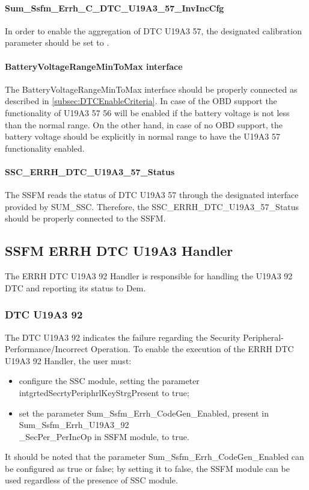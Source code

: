 \paragraph{Sum\_Ssfm\_Errh\_C\_DTC\_U19A3\_57\_InvIncCfg}
In order to enable the aggregation of DTC U19A3 57, the designated calibration parameter should be set to .

\paragraph{BatteryVoltageRangeMinToMax interface}
The BatteryVoltageRangeMinToMax interface should be properly connected as described in \ref{subsec:DTCEnableCriteria}. In case of the OBD support the
functionality of U19A3 57 56 will be enabled if the battery voltage is not less than the normal range. On the other hand, in case of no OBD support, the
battery voltage should be explicitly in normal range to have the U19A3 57 functionality enabled.

\paragraph{SSC\_ERRH\_DTC\_U19A3\_57\_Status}
The SSFM reads the status of DTC U19A3 57 through the designated interface provided by SUM\_SSC. Therefore, the SSC\_ERRH\_DTC\_U19A3\_57\_Status should 
be properly connected to the SSFM.


\subsection{SSFM ERRH DTC U19A3 Handler}
\label{subsec:SSFMERRHDTCU19A3Handler}
The ERRH DTC U19A3 92 Handler is responsible for handling the U19A3 92 DTC and reporting its status to Dem.

\subsubsection{DTC U19A3 92}

The DTC U19A3 92 indicates the failure regarding the Security Peripheral-Performance/Incorrect Operation.
To enable the execution of the ERRH DTC U19A3 92 Handler, the user must:
\begin{itemize} 
	\item configure the SSC module, setting the parameter intgrtedSecrtyPeriphrlKeyStrgPresent to true;
	\item set the parameter Sum\_Ssfm\_Errh\_CodeGen\_Enabled, present in Sum\_Ssfm\_Errh\_U19A3\_92\\\_SecPer\_PerIncOp in SSFM module, to true.
\end{itemize}
It should be noted that the parameter Sum\_Ssfm\_Errh\_CodeGen\_Enabled can be configured as true or false; by setting it to false, the SSFM module can be used regardless of the presence of SSC module.


